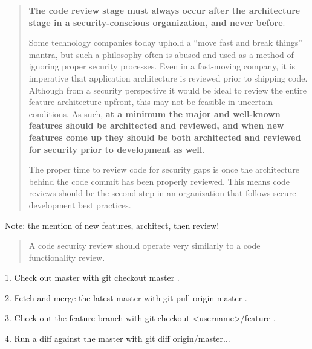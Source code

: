 \documentclass[Screen16to9,17pt]{foils}
\begin{document}


\begin{quote} {\bf
The code review stage must always occur after the architecture stage in a security-conscious organization, and never before}.

Some technology companies today uphold a “move fast and break things” mantra, but such a philosophy often is abused and used as a method of ignoring proper security processes. Even in a fast-moving company, it is imperative that application architecture is reviewed prior to shipping code. Although from a security perspective it would be ideal to review the entire feature architecture upfront, this may not be feasible in uncertain conditions. As such, {\bf at a minimum the major and well-known features should be architected and reviewed, and when new features come up they should be both architected and reviewed for security prior to development as well}.

The proper time to review code for security gaps is once the architecture behind the code commit has been properly reviewed. This means code reviews should be the second step in an organization that follows secure development best practices.
\end{quote}

\begin{list2}
\item Note: the mention of new features, architect, then review!
\end{list2}




\begin{quote}
A code security review should operate very similarly to a code functionality review.
\end{quote}

\begin{list2}
\item[1.] Check out master with git checkout master .
\item[2.] Fetch and merge the latest master with git pull origin master .
\item[3.] Check out the feature branch with git checkout <username>/feature .
\item[4.] Run a diff against the master with git diff origin/master...
\end{list2}
\end{document}
